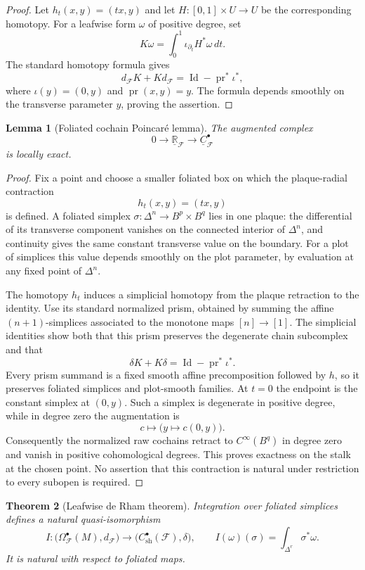 \documentclass[12pt]{amsart}
\newtheorem{thm}{Theorem}[section]
\newtheorem{lem}[thm]{Lemma}
\theoremstyle{definition}
\theoremstyle{remark}
\numberwithin{equation}{section}
\newcommand{\CF}{{\mathcal F}}
\newcommand{\R}{{\mathbb{R}}}
\newcommand{\1}{{\mathbb{1}}}
\newcommand{\id}{\operatorname{Id}}
\newcommand{\pr}{{\operatorname{pr}}}
\begin{document}
\begin{proof}
Let $h_t(x,y)=(tx,y)$ and let
$H:[0,1]\times U\to U$ be the corresponding homotopy.  For a
leafwise form $\omega$ of positive degree, set
\[
 K\omega=\int_0^1\iota_{\partial_t}H^*\omega\,dt.
\]
The standard homotopy formula gives
\[
 d_{\CF}K+Kd_{\CF}
 =\id-\pr^*\iota^*,
\]
where $\iota(y)=(0,y)$ and $\pr(x,y)=y$.  The formula depends smoothly
on the transverse parameter $y$, proving the assertion.
\end{proof}

\begin{lem}[Foliated cochain Poincar\'e lemma]\label{lem:cochain-poincare}
The augmented complex
\[
 0\longrightarrow\underline{\R}_{\CF}
 \longrightarrow\underline C^\bullet_{\CF}
\]
is locally exact.
\end{lem}

\begin{proof}
Fix a point and choose a smaller foliated box on which the
plaque-radial contraction
\[
 h_t(x,y)=(tx,y)
\]
is defined.  A foliated simplex
$\sigma:\Delta^n\to B^p\times B^q$ lies in one plaque: the differential
of its transverse component vanishes on the connected interior of
$\Delta^n$, and continuity gives the same constant transverse value on
the boundary.  For a plot of simplices this value depends smoothly on
the plot parameter, by evaluation at any fixed point of $\Delta^n$.

The homotopy $h_t$ induces a simplicial homotopy from the plaque
retraction to the identity.  Use its standard normalized prism,
obtained by summing the affine $(n+1)$-simplices associated to the
monotone maps $[n]\to[1]$.  The simplicial identities show both that
this prism preserves the degenerate chain subcomplex and that
\[
 \delta K+K\delta=\id-\pr^*\iota^*.
\]
Every prism summand is a fixed smooth affine precomposition followed
by $h$, so it preserves foliated simplices and plot-smooth families.
At $t=0$ the endpoint is the constant simplex at $(0,y)$.  Such a
simplex is degenerate in positive degree, while in degree zero the
augmentation is
\[
 c\longmapsto\bigl(y\longmapsto c(0,y)\bigr).
\]
Consequently the normalized raw cochains retract to $C^\infty(B^q)$
in degree zero and vanish in positive cohomological degrees.  This
proves exactness on the stalk at the chosen point.
No assertion that this contraction is natural under restriction to
every subopen is required.
\end{proof}

\begin{thm}[Leafwise de Rham theorem]\label{thm:leafwise-dr}
Integration over foliated simplices defines a natural quasi-isomorphism
\[
 I:\bigl(\Omega^\bullet_{\CF}(M),d_{\CF}\bigr)
 \longrightarrow
 \bigl(C^\bullet_{\mathrm{sh}}(\CF),\delta\bigr),
\qquad
 I(\omega)(\sigma)=\int_{\Delta^r}\sigma^*\omega.
\]
It is natural with respect to foliated maps.
\end{thm}
\end{document}
